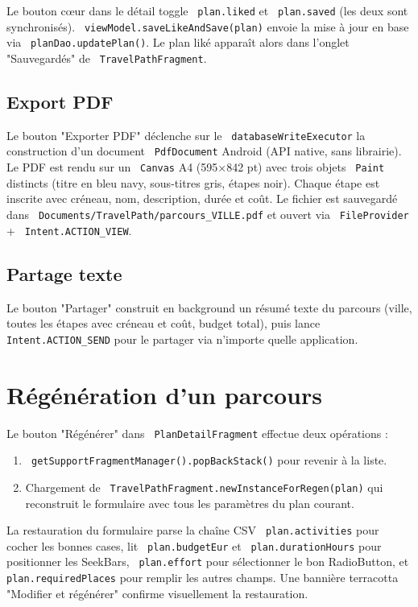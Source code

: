 \documentclass[a4paper,12pt,openany]{report}
\newcommand{\ic}[1]{\texttt{\small\colorbox{lightbg}{\color{navy!90} #1}}}
\begin{document}
Le bouton cœur dans le détail toggle \ic{plan.liked} et \ic{plan.saved}
(les deux sont synchronisés). \ic{viewModel.saveLikeAndSave(plan)} envoie
la mise à jour en base via \ic{planDao.updatePlan()}. Le plan liké apparaît
alors dans l'onglet "Sauvegardés" de \ic{TravelPathFragment}.

\subsection{Export PDF}

Le bouton "Exporter PDF" déclenche sur le \ic{databaseWriteExecutor} la
construction d'un document \ic{PdfDocument} Android (API native, sans librairie).
Le PDF est rendu sur un \ic{Canvas} A4 (595×842 pt) avec trois objets \ic{Paint}
distincts (titre en bleu navy, sous-titres gris, étapes noir). Chaque étape
est inscrite avec créneau, nom, description, durée et coût. Le fichier est
sauvegardé dans \ic{Documents/TravelPath/parcours\_VILLE.pdf} et ouvert via
\ic{FileProvider} + \ic{Intent.ACTION\_VIEW}.

\subsection{Partage texte}

Le bouton "Partager" construit en background un résumé texte du parcours
(ville, toutes les étapes avec créneau et coût, budget total), puis lance
\ic{Intent.ACTION\_SEND} pour le partager via n'importe quelle application.

\section{Régénération d'un parcours}

Le bouton "Régénérer" dans \ic{PlanDetailFragment} effectue deux opérations :
\begin{enumerate}
  \item \ic{getSupportFragmentManager().popBackStack()} pour revenir à la liste.
  \item Chargement de \ic{TravelPathFragment.newInstanceForRegen(plan)} qui
    reconstruit le formulaire avec tous les paramètres du plan courant.
\end{enumerate}

La restauration du formulaire parse la chaîne CSV \ic{plan.activities} pour
cocher les bonnes cases, lit \ic{plan.budgetEur} et \ic{plan.durationHours}
pour positionner les SeekBars, \ic{plan.effort} pour sélectionner le bon
RadioButton, et \ic{plan.requiredPlaces} pour remplir les autres champs.
Une bannière terracotta "Modifier et régénérer" confirme visuellement la restauration.
\end{document}
